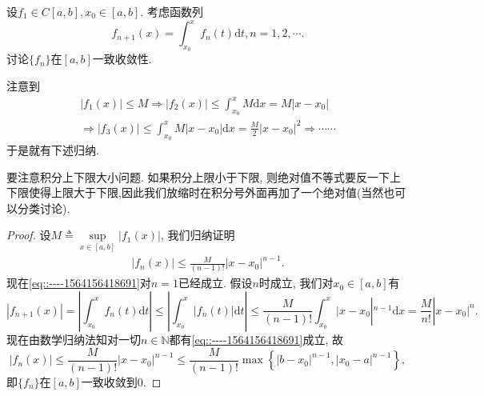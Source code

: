 \documentclass[../../main.tex]{subfiles}%
\begin{document}
\begin{example}
设$f_1\in C[a,b],x_0\in[a,b]$. 考虑函数列
$$
f_{n+1}(x)=\int_{x_0}^{x}f_n(t)\mathrm{d}t,n=1,2,\cdots.
$$
讨论$\{f_n\}$在$[a,b]$一致收敛性.
\end{example}
\begin{note}
注意到
\begin{gather*}
\left| f_1\left( x \right) \right|\leqslant M\Rightarrow \left| f_2\left( x \right) \right|\leqslant \int_{x_0}^x{M\mathrm{d}x}=M\left| x-x_0 \right|
\\
\Rightarrow \left| f_3\left( x \right) \right|\leqslant \int_{x_0}^x{M\left| x-x_0 \right|\mathrm{d}x}=\frac{M}{2}\left| x-x_0 \right|^2\Rightarrow \cdots \cdots 
\end{gather*}
于是就有下述归纳.
\end{note}
\begin{remark}
要注意积分上下限大小问题. 如果积分上限小于下限, 则绝对值不等式要反一下上下限使得上限大于下限,因此我们放缩时在积分号外面再加了一个绝对值(当然也可以分类讨论).
\end{remark}
\begin{proof}
设$M\triangleq\sup\limits_{x\in[a,b]}|f_1(x)|$, 我们归纳证明
\begin{align}
|f_n(x)|\leqslant\frac{M}{(n-1)!}|x-x_0|^{n-1}\label{eq::----1564156418691}.
\end{align}
现在\eqref{eq::----1564156418691}对$n=1$已经成立. 假设$n$时成立, 我们对$x_0\in [a,b]$有
$$
|f_{n+1}(x)|=\left| \int_{x_0}^x{f_n(t)\mathrm{d}t} \right|\leqslant \left| \int_{x_0}^x{\left| f_n(t) \right|\mathrm{d}t} \right|\leqslant \frac{M}{(n-1)!}\int_{x_0}^x{|x}-x_0|^{n-1}\mathrm{d}x=\frac{M}{n!}|x-x_0|^n.
$$
现在由数学归纳法知对一切$n\in\mathbb{N}$都有\eqref{eq::----1564156418691}成立, 故
$$
|f_n(x)|\leqslant\frac{M}{(n-1)!}|x-x_0|^{n-1}\leqslant\frac{M}{(n-1)!}\max\left\{|b-x_0|^{n-1},|x_0-a|^{n-1}\right\},
$$
即$\{f_n\}$在$[a,b]$一致收敛到$0$.
\end{proof}
\end{document}
